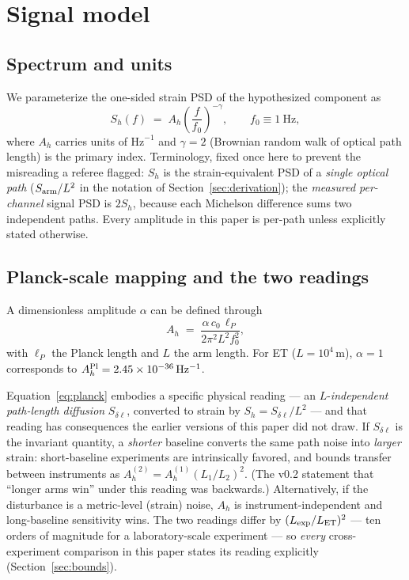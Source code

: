 \documentclass[11pt]{article}
\newcommand{\Ah}{A_h}
\newcommand{\Sh}{S_h}
\begin{document}
\section{Signal model}
\label{sec:model}

\subsection{Spectrum and units}

We parameterize the one-sided strain PSD of the hypothesized component as
\begin{equation}
\Sh(f) \;=\; \Ah \left(\frac{f}{f_0}\right)^{-\gamma},
\qquad f_0 \equiv 1~\mathrm{Hz},
\label{eq:psd}
\end{equation}
where $\Ah$ carries units of $\mathrm{Hz}^{-1}$ and $\gamma = 2$ (Brownian random walk of optical path length) is the primary index. Terminology, fixed once here to prevent the misreading a referee flagged: $\Sh$ is the strain-equivalent PSD of a \emph{single optical path} ($S_{\rm arm}/L^2$ in the notation of Section~\ref{sec:derivation}); the \emph{measured per-channel} signal PSD is $2\Sh$, because each Michelson difference sums two independent paths. Every amplitude in this paper is per-path unless explicitly stated otherwise.

\subsection{Planck-scale mapping and the two readings}
\label{sec:planck}

A dimensionless amplitude $\alpha$ can be defined through
\begin{equation}
\Ah \;=\; \frac{\alpha\, c_0\, \ell_P}{2\pi^2 L^2 f_0^{2}},
\label{eq:planck}
\end{equation}
with $\ell_P$ the Planck length and $L$ the arm length. For ET ($L = 10^4$\,m), $\alpha = 1$ corresponds to $\Ah^{\rm Pl} = 2.45\times10^{-36}\,\mathrm{Hz^{-1}}$.

Equation~\eqref{eq:planck} embodies a specific physical reading --- an $L$-\emph{independent path-length diffusion} $S_{\delta\ell}$, converted to strain by $\Sh = S_{\delta\ell}/L^2$ --- and that reading has consequences the earlier versions of this paper did not draw. If $S_{\delta\ell}$ is the invariant quantity, a \emph{shorter} baseline converts the same path noise into \emph{larger} strain: short-baseline experiments are intrinsically favored, and bounds transfer between instruments as $\Ah^{(2)} = \Ah^{(1)} (L_1/L_2)^2$. (The v0.2 statement that ``longer arms win'' under this reading was backwards.) Alternatively, if the disturbance is a metric-level (strain) noise, $\Ah$ is instrument-independent and long-baseline sensitivity wins. The two readings differ by $(L_{\rm exp}/L_{\rm ET})^2$ --- ten orders of magnitude for a laboratory-scale experiment --- so \emph{every} cross-experiment comparison in this paper states its reading explicitly (Section~\ref{sec:bounds}).
\end{document}
